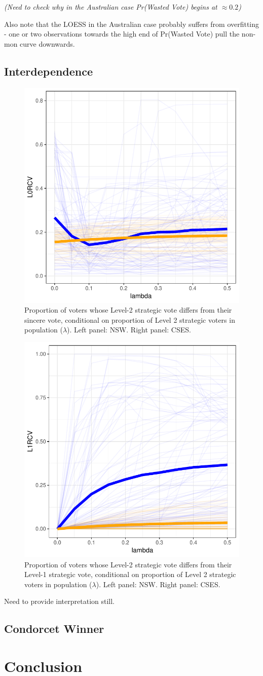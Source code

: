 \documentclass[11pt, letter]{article}
\begin{document}
\textit{(Need to check why in the Australian case Pr(Wasted Vote) begins at $\approx 0.2$)}

Also note that the LOESS in the Australian case probably suffers from overfitting - one or two observations towards the high end of Pr(Wasted Vote) pull the non-mon curve downwards.

\subsection{Interdependence} \label{interdep}

\begin{figure}[!h]
	\centering
	\includegraphics[width = .6 \textwidth]{"../output/figures/cses_l0"}
	\caption{Proportion of voters whose Level-2 strategic vote differs from their sincere vote, conditional on proportion of Level 2 strategic voters in population ($\lambda$). Left panel: NSW. Right panel: CSES.}
	\label{fig:figure1}
\end{figure}

\begin{figure}[!h]
	\centering
	\includegraphics[width = .6 \textwidth]{"../output/figures/cses_l1"}
	\caption{Proportion of voters whose Level-2 strategic vote differs from their Level-1 strategic vote, conditional on proportion of Level 2 strategic voters in population ($\lambda$). Left panel: NSW. Right panel: CSES.}
	\label{fig:figure1}
\end{figure}

Need to provide interpretation still.

\subsection{Condorcet Winner}

\section{Conclusion}
\end{document}
